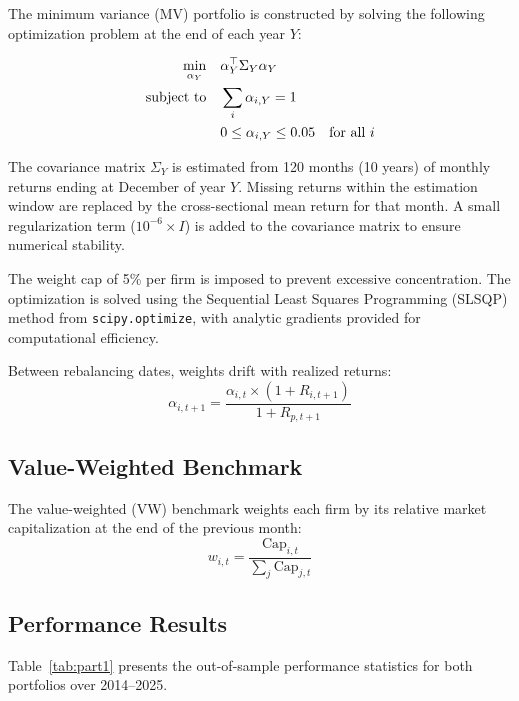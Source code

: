 \documentclass[12pt, a4paper]{article}
\begin{document}
The minimum variance (MV) portfolio is constructed by solving the following 
optimization problem at the end of each year $Y$:

\begin{align}
    \min_{\alpha_Y} \quad & \alpha_Y^\top \Sigma_Y \alpha_Y \\
    \text{subject to} \quad & \sum_i \alpha_{i,Y} = 1 \notag \\
    & 0 \leq \alpha_{i,Y} \leq 0.05 \quad \text{for all } i \notag
\end{align}

The covariance matrix $\Sigma_Y$ is estimated from 120 months (10 years) of 
monthly returns ending at December of year $Y$. Missing returns within the 
estimation window are replaced by the cross-sectional mean return for that 
month. A small regularization term ($10^{-6} \times I$) is added to the 
covariance matrix to ensure numerical stability.

The weight cap of 5\% per firm is imposed to prevent excessive concentration. 
The optimization is solved using the Sequential Least Squares Programming 
(SLSQP) method from \texttt{scipy.optimize}, with analytic gradients provided 
for computational efficiency.

Between rebalancing dates, weights drift with realized returns:
\[
\alpha_{i,t+1} = \frac{\alpha_{i,t} \times (1 + R_{i,t+1})}{1 + R_{p,t+1}}
\]

\subsection{Value-Weighted Benchmark}

The value-weighted (VW) benchmark weights each firm by its relative market 
capitalization at the end of the previous month:
\[
w_{i,t} = \frac{\text{Cap}_{i,t}}{\sum_j \text{Cap}_{j,t}}
\]

\subsection{Performance Results}

Table~\ref{tab:part1} presents the out-of-sample performance statistics for 
both portfolios over 2014--2025.
\end{document}
